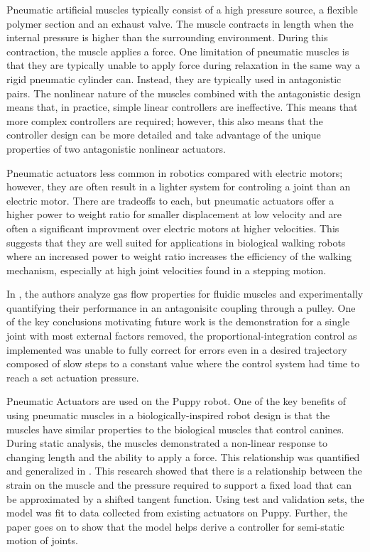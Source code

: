 
Pneumatic artificial muscles typically consist of a high pressure source, a
flexible polymer section and an exhaust valve. The muscle contracts in length
when the internal pressure is higher than the surrounding environment. During
this contraction, the muscle applies a force. One limitation of pneumatic
muscles is that they are typically unable to apply force during relaxation in
the same way a rigid pneumatic cylinder can. Instead, they are typically used in
antagonistic pairs. The nonlinear nature of the muscles combined with the
antagonistic design means that, in practice, simple linear controllers are
ineffective. This means that more complex controllers are required; however,
this also means that the controller design can be more detailed and take
advantage of the unique properties of two antagonistic nonlinear actuators.

Pneumatic actuators less common in robotics compared with electric motors;
however,
they are often result in a lighter system for controling a joint than an
electric motor. There are tradeoffs to each, but pneumatic actuators offer a
higher power to weight ratio for smaller displacement at low velocity and are
often a significant improvment over electric motors at higher velocities.
\cite{Tavakoli2008} This suggests that they are well suited for applications in
biological walking robots where an increased power to weight ratio increases
the efficiency of the walking mechanism, especially at high joint velocities
found in a stepping motion.


In \cite{Situm2008}, the authors analyze gas flow properties for fluidic muscles
and experimentally quantifying their performance in an antagonisitc coupling
through a pulley. One of the key conclusions motivating future work is the
demonstration for a single joint with most external factors removed, the
proportional-integration control as implemented was unable to fully correct for
errors even in a desired trajectory composed of slow steps to a constant value
where the control system had time to reach a set actuation pressure.

Pneumatic Actuators are used on the Puppy robot. One of the key
benefits of using pneumatic muscles in a biologically-inspired robot design is
that the muscles have similar properties to the biological muscles that control
canines. \cite{Tavakoli2008}
During static analysis, the muscles demonstrated a non-linear response to
changing length and the ability to apply a force. This relationship was
quantified and generalized in \cite{HuntPMuscles}. This research showed that
there is a relationship between the strain on the muscle and the pressure
required to support a fixed load that can be approximated by a shifted tangent
function. Using test and validation sets, the model was fit to data collected
from existing actuators on Puppy. Further, the paper goes on to show that the
model helps derive a controller for semi-static motion of joints. 
\cite{HuntPMuscles}

